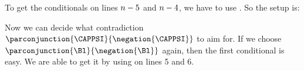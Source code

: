 To get the conditionals on lines $n-5$ and $n-4$, we have to use . So the setup is:
\begin{gproof}
\end{gproof}
Now we can decide what contradiction $\parconjunction{\CAPPSI}{\negation{\CAPPSI}}$ to aim for. If we choose $\parconjunction{\Bl}{\negation{\Bl}}$ again, then the first conditional is easy. We are able to get it by using  on lines 5 and 6.
